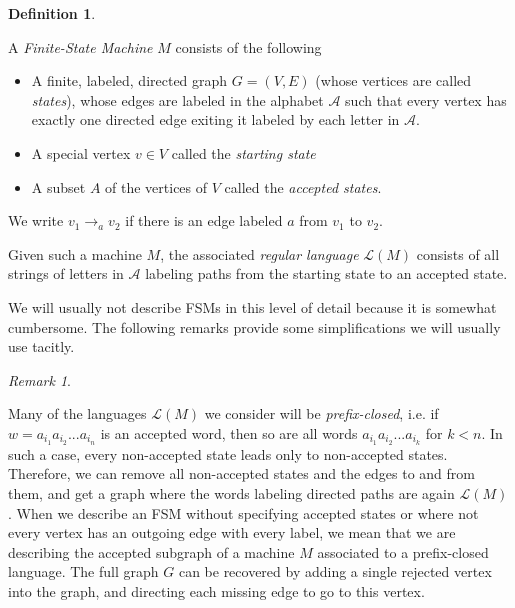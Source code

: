 \documentclass[10pt,a4paper]{amsart}
\theoremstyle{definition}
\newtheorem{definition}[theorem]{Definition}
\theoremstyle{remark}
\newtheorem{remark}[theorem]{Remark}
\begin{document}
	\begin{definition} \label{FSMDef}
		
		A \textit{Finite-State Machine} $M$ consists of the following
		
		\begin{itemize}
			\item A finite, labeled, directed graph $G=(V,E)$ (whose vertices are called \textit{states}), whose edges are labeled in the alphabet $\mathscr{A}$ such that every vertex has exactly one directed edge exiting it labeled by each letter in $\mathscr{A}$.
			\item A special vertex $v\in V$ called the \textit{starting state}	
			\item A subset $A$ of the vertices of $V$ called the \textit{accepted states}.
		\end{itemize}
		
		We write $v_1\to_{a} v_2$ if there is an edge labeled $a$ from $v_1$ to $v_2$.
		
		Given such a machine $M$, the associated \textit{regular language} $\mathscr{L}(M)$ consists of all strings of letters in $\mathscr{A}$ labeling paths from the starting state to an accepted state.
		
	\end{definition}
	
	We will usually not describe FSMs in this level of detail because it is somewhat cumbersome. The following remarks provide some simplifications we will usually use tacitly.
	
	\begin{remark}\label{PrefixClosedLanguages}
		
		Many of the languages $\mathscr{L}(M)$ we consider will be \textit{prefix-closed}, i.e. if $w=a_{i_1}a_{i_2}...a_{i_n}$ is an accepted word, then so are all words $a_{i_1}a_{i_2}...a_{i_k}$ for $k<n$. In such a case, every non-accepted state leads only to non-accepted states. Therefore, we can remove all non-accepted states and the edges to and from them, and get a graph where the words labeling directed paths are again $\mathscr{L}(M)$. When we describe an FSM without specifying accepted states or where not every vertex has an outgoing edge with every label, we mean that we are describing the accepted subgraph of a machine $M$ associated to a prefix-closed language. The full graph $G$ can be recovered by adding a single rejected vertex into the graph, and directing each missing edge to go to this vertex.
		
	\end{remark}
	
\end{document}
